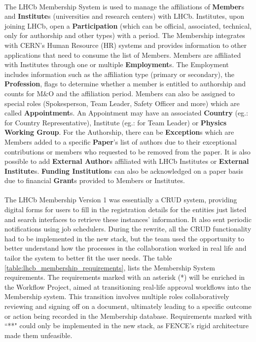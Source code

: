 \paragraph{} The LHCb Membership System is used to manage the affiliations of \textbf{Member}s and \textbf{Institute}s (universities and research centers) with LHCb. Institutes, upon joining LHCb, open a \textbf{Participation} (which can be official, associated, technical, only for authorship and other types) with a period.  The Membership integrates with CERN's Human Resource (HR) systems and provides information to other applications that need to consume the list of Members. Members are affiliated with Institutes through one or multiple \textbf{Employment}s. The Employment includes information such as the affiliation type (primary or secondary), the \textbf{Profession}, flags to determine whether a member is entitled to authorship and counts for M\&O and the affiliation period. Members can also be assigned to special roles (Spokesperson, Team Leader, Safety Officer and more) which are called \textbf{Appointment}s. An Appointment may have an associated \textbf{Country} (eg.: for Country Representative), Institute (eg.: for Team Leader) or \textbf{Physics Working Group}. For the Authorship, there can be \textbf{Exception}s which are Members added to a specific \textbf{Paper}'s list of authors due to their exceptional contributions or members who requested to be removed from the paper. It is also possible to add \textbf{External Author}s affiliated with LHCb Institutes or \textbf{External Institute}s. \textbf{Funding Institution}s can also be acknowledged on a paper basis due to financial \textbf{Grant}s provided to Members or Institutes.

\paragraph{} The LHCb Membership Version 1 was essentially a CRUD system, providing digital forms for users to fill in the registration details for the entities just listed and search interfaces to retrieve these instances' information. It also sent periodic notifications using job schedulers. During the rewrite, all the CRUD functionality had to be implemented in the new stack, but the team used the opportunity to better understand how the processes in the collaboration worked in real life  and tailor the system to better fit the user needs. The table \ref{table:lhcb_membership_requirements}, lists the Membership System requirements. The requirements marked with an asterisk (*) will be enriched in the Workflow Project, aimed at transitioning real-life approval workflows into the Membership system. This transition involves multiple roles collaboratively reviewing and signing off on a document, ultimately leading to a specific outcome or action being recorded in the Membership database. Requirements marked with ``**" could only be implemented in the new stack, as FENCE's rigid architecture made them unfeasible.


